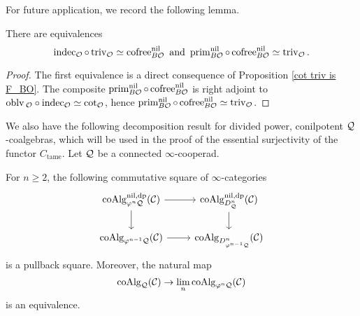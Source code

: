 For future application, we record the following lemma.
\begin{lemma}
\cite[(3.4) and (3.5)]{Francis-Gaitsgory}
\label{CE of Trivial is cofree}
There are equivalences
$$
\operatorname{indec}_{{\mathcal{O}}}\circ\operatorname{triv}_{{\mathcal{O}}} \simeq \operatorname{cofree}^{\operatorname{nil}}_{B{\mathcal{O}}}  \text{ and } 
\operatorname{prim}_{B{\mathcal{O}}}^{\operatorname{nil}} \circ \operatorname{cofree}^{\operatorname{nil}}_{B{\mathcal{O}}} \simeq \operatorname{triv}_{{\mathcal{O}}}.
$$
\end{lemma}
\begin{proof}
    The first equivalence is a direct consequence of Proposition \ref{cot triv is F_BO}.
    The composite $\operatorname{prim}_{B{\mathcal{O}}}^{\operatorname{nil}} \circ \operatorname{cofree}^{\operatorname{nil}}_{B{\mathcal{O}}}$ is right adjoint to
    $\operatorname{oblv}{_{{\mathcal{O}}}\circ \operatorname{indec}_{{\mathcal{O}}}}\simeq \cot_{{\mathcal{O}}}$, hence $\operatorname{prim}_{B{\mathcal{O}}}^{\operatorname{nil}} \circ \operatorname{cofree}^{\operatorname{nil}}_{B{\mathcal{O}}} \simeq \operatorname{triv}_{{\mathcal{O}}}$.
\end{proof}



We also have the following decomposition result for divided power, conilpotent ${\mathcal{Q}}$-coalgebras, which will be used in the proof of the essential surjectivity of the functor $C_{\operatorname{tame}}$. Let ${\mathcal{Q}}$ be a connected $\infty$-cooperad.
\begin{proposition}
\cite[Theorem 4.13]{Heuts_Koszul}
\label{inductive construction of coalgebras}
    For $n\geq 2$, the following commutative square of $\infty$-categories 
\[
\begin{tikzcd}
	\coAlg^{\nil, \divpow}_{\varphi^n \CQ}(\CC) & 
	\coAlg^{\nil, \divpow}_{D^n_{\CQ}}(\CC)\\
	\coAlg_{\varphi^{n-1} \CQ}(\CC) & 
	\coAlg_{D^n_{\varphi^{n-1}\CQ}}(\CC)
	\arrow[from=1-1, to= 1-2]
	\arrow[from=1-1, to=2-1]
	\arrow[from=1-2, to=2-2]
	\arrow[from=2-1, to= 2-2]
\end{tikzcd}
\]
is a pullback square. Moreover, the natural map
$$
\operatorname{coAlg}_{{\mathcal{Q}}}({\mathcal{C}}) \to \lim_n \operatorname{coAlg}_{\varphi^n{\mathcal{Q}}}({\mathcal{C}})
$$
is an equivalence.
\end{proposition}


